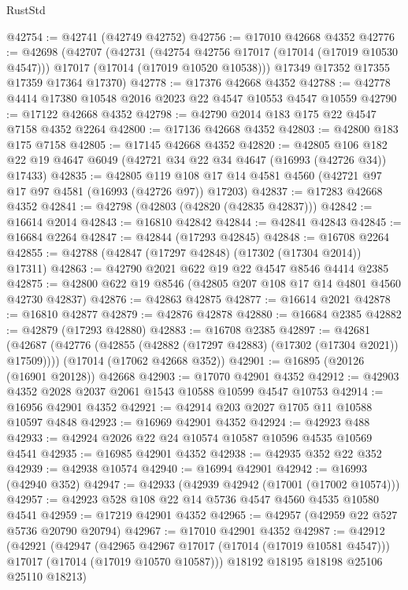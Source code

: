 \begin{lexlean}{RustStd}
\begin{coremodule}
{\begin{coremodule}
{{{{{{{{{{{{{{{{{{{{{{{{{{{{{{{{{{{{{{{{{{{{{{{{{{{{{{{@42754 := @42741 (@42749 @42752)
@42756 := @17010 @42668 @4352
@42776 := @42698
    (@42707
      (@42731
        (@42754 @42756 @17017 (@17014 (@17019 @10530 @4547)))
        @17017
        (@17014 (@17019 @10520 @10538)))
      @17349
      @17352
      @17355
      @17359
      @17364
      @17370)
@42778 := @17376 @42668 @4352
@42788 := @42778 @4414 @17380 @10548 @2016 @2023 @22 @4547 @10553 @4547 @10559
@42790 := @17122 @42668 @4352
@42798 := @42790 @2014 @183 @175 @22 @4547 @7158 @4352 @2264
@42800 := @17136 @42668 @4352
@42803 := @42800 @183 @175 @7158
@42805 := @17145 @42668 @4352
@42820 := @42805
    @106
    @182
    @22
    @19
    @4647
    @6049
    (@42721 @34 @22 @34 @4647 (@16993 (@42726 @34)) @17433)
@42835 := @42805
    @119
    @108
    @17
    @14
    @4581
    @4560
    (@42721 @97 @17 @97 @4581 (@16993 (@42726 @97)) @17203)
@42837 := @17283 @42668 @4352
@42841 := @42798 (@42803 (@42820 (@42835 @42837)))
@42842 := @16614 @2014
@42843 := @16810 @42842
@42844 := @42841 @42843
@42845 := @16684 @2264
@42847 := @42844 (@17293 @42845)
@42848 := @16708 @2264
@42855 := @42788 (@42847 (@17297 @42848) (@17302 (@17304 @2014)) @17311)
@42863 := @42790 @2021 @622 @19 @22 @4547 @8546 @4414 @2385
@42875 := @42800 @622 @19 @8546 (@42805 @207 @108 @17 @14 @4801 @4560 @42730 @42837)
@42876 := @42863 @42875
@42877 := @16614 @2021
@42878 := @16810 @42877
@42879 := @42876 @42878
@42880 := @16684 @2385
@42882 := @42879 (@17293 @42880)
@42883 := @16708 @2385
@42897 := @42681
    (@42687 (@42776 (@42855 (@42882 (@17297 @42883) (@17302 (@17304 @2021)) @17509))))
    (@17014 (@17062 @42668 @352))
@42901 := @16895 (@20126 (@16901 @20128)) @42668
@42903 := @17070 @42901 @4352
@42912 := @42903 @4352 @2028 @2037 @2061 @1543 @10588 @10599 @4547 @10753
@42914 := @16956 @42901 @4352
@42921 := @42914 @203 @2027 @1705 @11 @10588 @10597 @4848
@42923 := @16969 @42901 @4352
@42924 := @42923 @488
@42933 := @42924 @2026 @22 @24 @10574 @10587 @10596 @4535 @10569 @4541
@42935 := @16985 @42901 @4352
@42938 := @42935 @352 @22 @352
@42939 := @42938 @10574
@42940 := @16994 @42901
@42942 := @16993 (@42940 @352)
@42947 := @42933 (@42939 @42942 (@17001 (@17002 @10574)))
@42957 := @42923 @528 @108 @22 @14 @5736 @4547 @4560 @4535 @10580 @4541
@42959 := @17219 @42901 @4352
@42965 := @42957 (@42959 @22 @527 @5736 @20790 @20794)
@42967 := @17010 @42901 @4352
@42987 := @42912
    (@42921
      (@42947
        (@42965 @42967 @17017 (@17014 (@17019 @10581 @4547)))
        @17017
        (@17014 (@17019 @10570 @10587)))
      @18192
      @18195
      @18198
      @25106
      @25110
      @18213)
}}}}}}}}}}}}}}}}}}}}}}}}}}}}}}}}}}}}}}}}}}}}}}}}}}}}}}}
\end{coremodule}}
\end{coremodule}
\end{lexlean}
